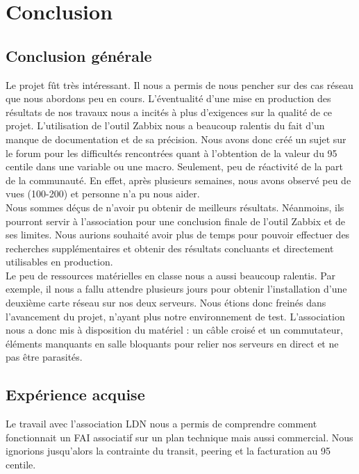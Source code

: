 \section{Conclusion}
	\subsection{Conclusion générale}
		\vspace{0.3cm}

		Le projet fût très intéressant. Il nous a permis de nous pencher sur des cas réseau que nous abordons peu en cours. L'éventualité d'une mise en production des résultats de nos travaux nous a incités à plus d'exigences sur la qualité de ce projet. L'utilisation de l'outil Zabbix nous a beaucoup ralentis du fait d’un manque de documentation et de sa précision. Nous avons donc créé un sujet sur le forum pour les difficultés rencontrées quant à l'obtention de la valeur du 95 centile dans une variable ou une macro. Seulement, peu de réactivité de la part de la communauté. En effet, après plusieurs semaines, nous avons observé peu de vues (100-200) et personne n'a pu nous aider.\\

		Nous sommes déçus de n'avoir pu obtenir de meilleurs résultats. Néanmoins, ils pourront servir à l'association pour une conclusion finale de l'outil Zabbix et de ses limites. Nous aurions souhaité avoir plus de temps pour pouvoir effectuer des recherches supplémentaires et obtenir des résultats concluants et directement utilisables en production.\\

		Le peu de ressources matérielles en classe nous a aussi beaucoup ralentis. Par exemple, il nous a fallu attendre plusieurs jours pour obtenir l'installation d'une deuxième carte réseau sur nos deux serveurs. Nous étions donc freinés dans l’avancement du projet, n’ayant plus notre environnement de test. L'association nous a donc mis à disposition du matériel : un câble croisé et un commutateur, éléments manquants en salle bloquants pour relier nos serveurs en direct et ne pas être parasités.\\

	\subsection{Expérience acquise}
		\vspace{0.3cm}

		Le travail avec l'association LDN nous a permis de comprendre comment fonctionnait un FAI associatif sur un plan technique mais aussi commercial. Nous ignorions jusqu'alors la contrainte du transit, peering et la facturation au 95 centile.\\

